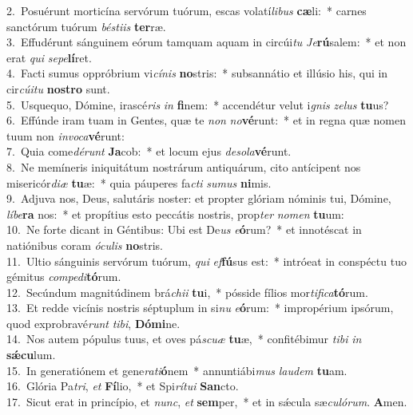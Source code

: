 {2.~}Posuérunt morticína servórum tuórum, escas volatí\textit{li}\textit{bus} \textbf{cæ}li:~* carnes sanctórum tuórum \textit{bé}\textit{sti}\textit{is} \textbf{ter}ræ.\\
{3.~}Effudérunt sánguinem eórum tamquam aquam in circúi\textit{tu} \textit{Je}\textbf{rú}salem:~* et non erat \textit{qui} \textit{se}\textit{pe}\textbf{lí}ret.\\
{4.~}Facti sumus oppróbrium vi\textit{cí}\textit{nis} \textbf{no}stris:~* subsannátio et illúsio his, qui in cir\textit{cú}\textit{i}\textit{tu} \textbf{no}\textbf{stro} sunt.\\
{5.~}Usquequo, Dómine, irascé\textit{ris} \textit{in} \textbf{fi}nem:~* accendétur velut i\textit{gnis} \textit{ze}\textit{lus} \textbf{tu}us?\\
{6.~}Effúnde iram tuam in Gentes, quæ te \textit{non} \textit{no}\textbf{vé}runt:~* et in regna quæ nomen tuum non \textit{in}\textit{vo}\textit{ca}\textbf{vé}runt:\\
{7.~}Quia come\textit{dé}\textit{runt} \textbf{Ja}cob:~* et locum ejus \textit{de}\textit{so}\textit{la}\textbf{vé}runt.\\
{8.~}Ne memíneris iniquitátum nostrárum antiquárum, cito antícipent nos misericór\textit{di}\textit{æ} \textbf{tu}æ:~* quia páuperes fa\textit{cti} \textit{su}\textit{mus} \textbf{ni}mis.\\
{9.~}Adjuva nos, Deus, salutáris noster: et propter glóriam nóminis tui, Dómine, \textit{lí}\textit{be}\textbf{ra} nos:~* et propítius esto peccátis nostris, prop\textit{ter} \textit{no}\textit{men} \textbf{tu}um:\\
{10.~}Ne forte dicant in Géntibus: Ubi est De\textit{us} \textit{e}\textbf{ó}rum?~* et innotéscat in natiónibus coram \textit{ó}\textit{cu}\textit{lis} \textbf{no}stris.\\
{11.~}Ultio sánguinis servórum tuórum, \textit{qui} \textit{ef}\textbf{fú}sus est:~* intróeat in conspéctu tuo gémitus \textit{com}\textit{pe}\textit{di}\textbf{tó}rum.\\
{12.~}Secúndum magnitúdinem brá\textit{chi}\textit{i} \textbf{tu}i,~* pósside fílios mor\textit{ti}\textit{fi}\textit{ca}\textbf{tó}rum.\\
{13.~}Et redde vicínis nostris séptuplum in si\textit{nu} \textit{e}\textbf{ó}rum:~* impropérium ipsórum, quod exprobravé\textit{runt} \textit{ti}\textit{bi}, \textbf{Dó}\textbf{mi}ne.\\
{14.~}Nos autem pópulus tuus, et oves pá\textit{scu}\textit{æ} \textbf{tu}æ,~* confitébimur \textit{ti}\textit{bi} \textit{in} \textbf{sǽ}\textbf{cu}lum.\\
{15.~}In generatiónem et gene\textit{ra}\textit{ti}\textbf{ó}nem~* annuntiábi\textit{mus} \textit{lau}\textit{dem} \textbf{tu}am.\\
{16.~}Glória Pa\textit{tri}, \textit{et} \textbf{Fí}lio,~* et Spi\textit{rí}\textit{tu}\textit{i} \textbf{San}cto.\\
{17.~}Sicut erat in princípio, et \textit{nunc}, \textit{et} \textbf{sem}per,~* et in sǽcula sæ\textit{cu}\textit{ló}\textit{rum}. \textbf{A}men.\\
